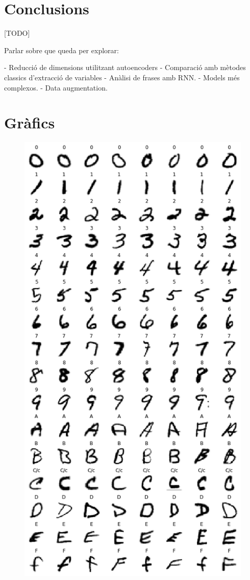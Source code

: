 \documentclass[12pt, spanish]{article}
\begin{document}
\section{Conclusions}

[TODO]

Parlar sobre que queda per explorar:

- Reducció de dimensions utilitzant autoencoders
- Comparació amb mètodes classics d'extracció de variables
- Anàlisi de frases amb RNN.
- Models més complexos.
- Data augmentation.


\clearpage
\appendix \label{sec:A}
\section{Gràfics}


\begin{figure}[hbt!]
\centering
\begin{minipage}{.33\textwidth}
  \centering
  \includegraphics[width=.95\linewidth]{images/samples_by_label1.png}

\end{minipage}
\end{figure}
\end{document}
